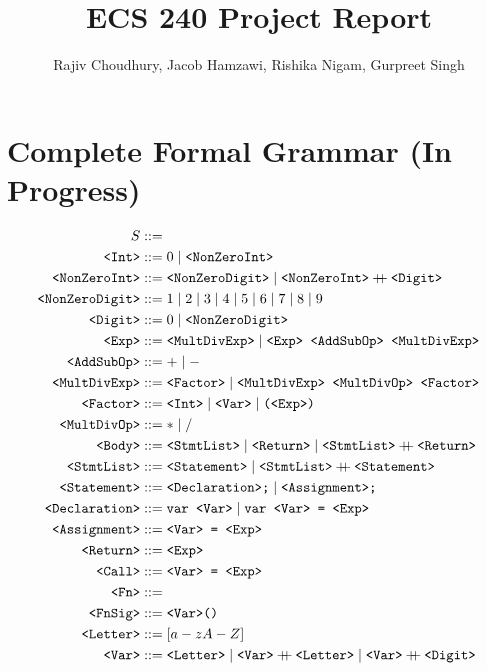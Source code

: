 \documentclass[12pt, letterpaper]{article}
\title{ECS 240 Project Report}
\author{Rajiv Choudhury, Jacob Hamzawi, Rishika Nigam, Gurpreet Singh}
\begin{document}
\maketitle

\section{Complete Formal Grammar (In Progress)}

\newcommand{\concat}{%
  \mathbin{{+}\mspace{-8mu}{+}}%
}

\begin{align*}
  S &::= \\
  \texttt{<Int>} &::= 0 \mid \texttt{<NonZeroInt>} \\
  \texttt{<NonZeroInt>} &::= \texttt{<NonZeroDigit>} \mid \texttt{<NonZeroInt>} \concat \texttt{<Digit>} \\
  \texttt{<NonZeroDigit>} &::= 1 \mid 2 \mid 3 \mid 4 \mid 5 \mid 6 \mid 7 \mid 8 \mid 9 \\
  \texttt{<Digit>} &::= 0 \mid \texttt{<NonZeroDigit>} \\
  \texttt{<Exp>} &::= \texttt{<MultDivExp>} \mid \texttt{<Exp> <AddSubOp> <MultDivExp>}  \\
  \texttt{<AddSubOp>} &::= + \mid - \\
  \texttt{<MultDivExp>} &::= \texttt{<Factor>} \mid \texttt{<MultDivExp> <MultDivOp> <Factor>} \\
  \texttt{<Factor>} &::= \texttt{<Int>} \mid \texttt{<Var>} \mid \texttt{(<Exp>)} \\
  \texttt{<MultDivOp>} &::= * \mid / \\
  \texttt{<Body>} &::= \texttt{<StmtList>} \mid \texttt{<Return>} \mid \texttt{<StmtList>} \concat \texttt{<Return>} \\
  \texttt{<StmtList>} &::= \texttt{<Statement>} \mid \texttt{<StmtList>} \concat \texttt{<Statement>} \\
  \texttt{<Statement>} &::= \texttt{<Declaration>;} \mid \texttt{<Assignment>;} \\
  \texttt{<Declaration>} &::= \texttt{var <Var>} \mid \texttt{var <Var> = <Exp>} \\
  \texttt{<Assignment>} &::= \texttt{<Var> = <Exp>} \\
  \texttt{<Return>} &::= \texttt{<Exp>} \\
  \texttt{<Call>} &::= \texttt{<Var> = <Exp>} \\
  \texttt{<Fn>} &::= \\
  \texttt{<FnSig>} &::= \texttt{<Var>()} \\
  \texttt{<Letter>} &::= [a-zA-Z] \\
  \texttt{<Var>} &::= \texttt{<Letter>} \mid \texttt{<Var>} \concat \texttt{<Letter>} \mid \texttt{<Var>} \concat \texttt{<Digit>} \\
\end{align*}
\end{document}
